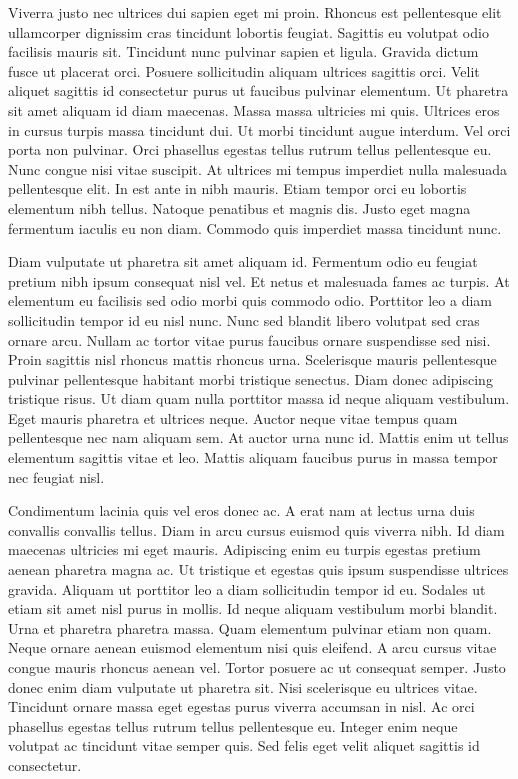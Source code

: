 \documentclass[11pt,a4paper]{article}
\begin{document}
Viverra justo nec ultrices dui sapien eget mi proin. Rhoncus est pellentesque elit ullamcorper dignissim cras tincidunt lobortis feugiat. Sagittis eu volutpat odio facilisis mauris sit. Tincidunt nunc pulvinar sapien et ligula. Gravida dictum fusce ut placerat orci. Posuere sollicitudin aliquam ultrices sagittis orci. Velit aliquet sagittis id consectetur purus ut faucibus pulvinar elementum. Ut pharetra sit amet aliquam id diam maecenas. Massa massa ultricies mi quis. Ultrices eros in cursus turpis massa tincidunt dui. Ut morbi tincidunt augue interdum. Vel orci porta non pulvinar. Orci phasellus egestas tellus rutrum tellus pellentesque eu. Nunc congue nisi vitae suscipit. At ultrices mi tempus imperdiet nulla malesuada pellentesque elit. In est ante in nibh mauris. Etiam tempor orci eu lobortis elementum nibh tellus. Natoque penatibus et magnis dis. Justo eget magna fermentum iaculis eu non diam. Commodo quis imperdiet massa tincidunt nunc.

Diam vulputate ut pharetra sit amet aliquam id. Fermentum odio eu feugiat pretium nibh ipsum consequat nisl vel. Et netus et malesuada fames ac turpis. At elementum eu facilisis sed odio morbi quis commodo odio. Porttitor leo a diam sollicitudin tempor id eu nisl nunc. Nunc sed blandit libero volutpat sed cras ornare arcu. Nullam ac tortor vitae purus faucibus ornare suspendisse sed nisi. Proin sagittis nisl rhoncus mattis rhoncus urna. Scelerisque mauris pellentesque pulvinar pellentesque habitant morbi tristique senectus. Diam donec adipiscing tristique risus. Ut diam quam nulla porttitor massa id neque aliquam vestibulum. Eget mauris pharetra et ultrices neque. Auctor neque vitae tempus quam pellentesque nec nam aliquam sem. At auctor urna nunc id. Mattis enim ut tellus elementum sagittis vitae et leo. Mattis aliquam faucibus purus in massa tempor nec feugiat nisl.

Condimentum lacinia quis vel eros donec ac. A erat nam at lectus urna duis convallis convallis tellus. Diam in arcu cursus euismod quis viverra nibh. Id diam maecenas ultricies mi eget mauris. Adipiscing enim eu turpis egestas pretium aenean pharetra magna ac. Ut tristique et egestas quis ipsum suspendisse ultrices gravida. Aliquam ut porttitor leo a diam sollicitudin tempor id eu. Sodales ut etiam sit amet nisl purus in mollis. Id neque aliquam vestibulum morbi blandit. Urna et pharetra pharetra massa. Quam elementum pulvinar etiam non quam. Neque ornare aenean euismod elementum nisi quis eleifend. A arcu cursus vitae congue mauris rhoncus aenean vel. Tortor posuere ac ut consequat semper. Justo donec enim diam vulputate ut pharetra sit. Nisi scelerisque eu ultrices vitae. Tincidunt ornare massa eget egestas purus viverra accumsan in nisl. Ac orci phasellus egestas tellus rutrum tellus pellentesque eu. Integer enim neque volutpat ac tincidunt vitae semper quis. Sed felis eget velit aliquet sagittis id consectetur.
\end{document}
